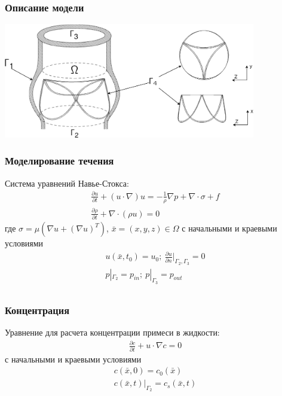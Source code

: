 \documentclass[14pt]{beamer}
\begin{document}
\begin{frame}
\frametitle{Описание модели}
    \begin{center}
        \includegraphics[width=11cm]{aorta_valve_scheme.png}
    \end{center}
\end{frame}

\begin{frame}
\frametitle{Моделирование течения}
Система уравнений Навье-Стокса:
\begin{gather}
    \label{eq:motion}
    \frac{\partial u}{\partial t} + (u \cdot \nabla) u = - \frac{1}{\rho} \nabla p + \nabla \cdot \sigma + f\\
    \label{eq:continuity}
    \frac{\partial \rho}{\partial t} + \nabla \cdot (\rho u) = 0 
\end{gather}
где $\sigma = \mu (\nabla u + (\nabla u)^{T})$, $\bar{x} = (x, y, z) \in \Omega$ с начальными и краевыми условиями
\begin{gather*}
    u(\bar{x}, t_0) = u_0;\ \frac{\partial u}{\partial n}|_{\Gamma_2, \Gamma_3} = 0\\
    p|_{\Gamma_2} = p_{in};\ p|_{\Gamma_3} = p_{out} \\
\end{gather*}

\end{frame}

\begin{frame}
\frametitle{Концентрация}
Уравнение для расчета концентрации примеси в жидкости:
\begin{gather}
    \label{eq:concentration}
    \frac{\partial c}{\partial t} + u \cdot \nabla c = 0
\end{gather}
с начальными и краевыми условиями
\begin{gather*}
    c(\bar{x}, 0) = c_0(\bar{x})\\
    c(\bar{x}, t)|_{\Gamma_2} = c_s(\bar{x}, t)
\end{gather*}

\end{frame}
\end{document}
